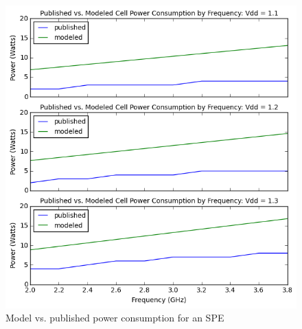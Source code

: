 \documentclass{sig-alternate-05-2015}
\begin{document}
\begin{figure}
\centering
\includegraphics[scale=0.6]{./spe-voltage-freq}
\caption{Model vs. published power consumption for an SPE}
\label{spe-voltage-freq}
\end{figure}


%
%
\end{document}
